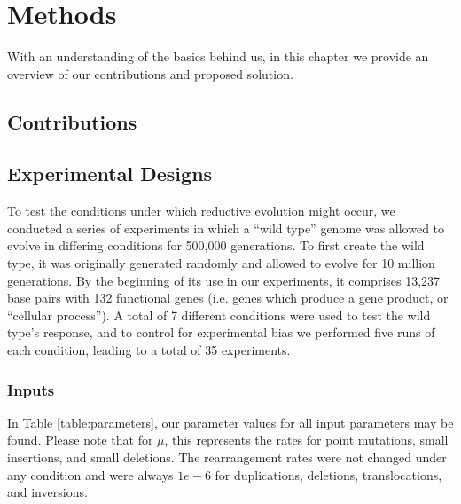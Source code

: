 \chapter{Methods}\label{ch:methods}
With an understanding of the basics behind us, in this chapter we provide an overview of our contributions and proposed solution.

\section{Contributions}

\section{Experimental Designs} \label{experimental_design}
To test the conditions under which reductive evolution might occur, we conducted a series of experiments in which a ``wild type'' genome was allowed to evolve in differing conditions for 500,000 generations. To first create the wild type, it was originally generated randomly and allowed to evolve for 10 million generations. By the beginning of its use in our experiments, it comprises 13,237 base pairs with 132 functional genes (i.e. genes which produce a gene product, or ``cellular process'').  A total of 7 different conditions were used to test the wild type's response, and to control for experimental bias we performed five runs of each condition, leading to a total of 35 experiments. 

\subsection{Inputs}
In Table \ref{table:parameters}, our parameter values for all input parameters may be found. Please note that for $\mu$, this represents the rates for point mutations, small insertions, and small deletions. The rearrangement rates were not changed under any condition and were always $1e-6$ for duplications, deletions, translocations, and inversions. 

